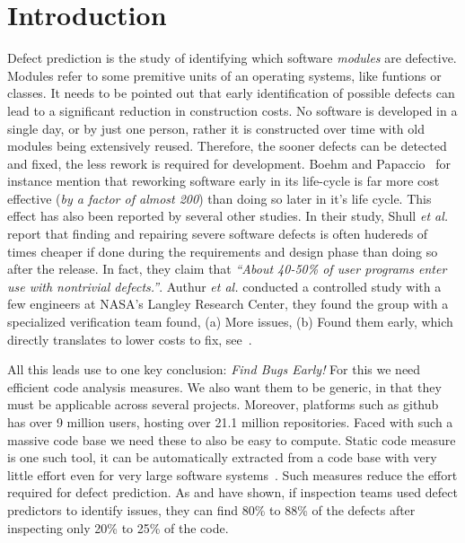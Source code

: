 \documentclass[12pt]{IEEEtran}
\begin{document}
\section{Introduction} \label{intro}
Defect prediction is the study of identifying which software \textit{modules} are defective. Modules refer to some premitive units of an operating systems, like funtions or classes. It needs to be pointed out that early identification of possible defects can lead to a significant reduction in construction costs. No software is developed in a single day, or by just one person, rather it is constructed over time with old modules being extensively reused. Therefore, the sooner defects can be detected and fixed, the less rework is required for development. Boehm and Papaccio~\cite{boehm88} for instance mention that reworking software early in its life-cycle is far more cost effective (\textit{by a factor of almost 200}) than doing so later in it's life cycle. This effect has also been reported by several other studies. In their study, Shull \textit{et al.}~\cite{shull2002we} report that finding and repairing severe software defects is often hudereds of times cheaper if done during the requirements and design phase than doing so after the release. In fact, they claim that \textit{``About 40-50\% of user programs enter use with
  nontrivial defects.''}. Authur \textit{et al.} \cite{arthur99} conducted a controlled study with a few engineers at NASA's Langley Research Center, they found the group with a specialized verification team found, (a) More issues, (b) Found them early, which directly translates to lower costs to fix, see~\cite{dabney2006predicting}. 

All this leads use to one key conclusion: \textit{Find Bugs Early!} For this we need efficient code analysis measures. We also want them to be generic, in that they must be applicable across several projects. Moreover, platforms such as github has over 9 million users, hosting over 21.1 million repositories. Faced with such a massive code base we need these to also be easy to compute. Static code measure is one such tool, it can be automatically extracted from a code base with very little effort even for very large software systems~\cite{nagappan2005static}. Such measures reduce the effort required for defect prediction. As \cite{tosun2010ai} and \cite{ostrand2004bugs} have shown, if inspection teams used defect predictors to identify  issues, they can find 80\% to 88\% of the defects after inspecting only 20\% to 25\% of the code. 
\end{document}
